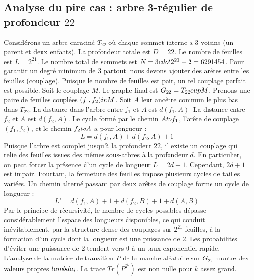\documentclass[12pt,a4paper]{article}
\begin{document}
\subsection{Analyse du pire cas : arbre 3-r\'egulier de profondeur $22$}
Consid\'erons un arbre enracin\'e $T_{22}$ o\`u chaque sommet interne a 3 voisins (un parent et deux enfants).
La profondeur totale est $D = 22$.
Le nombre de feuilles est $L = 2^{21}$.
Le nombre total de sommets est $N = 3 \\cdot 2^{21} - 2 = 6291454$.
Pour garantir un degr\'e minimum de 3 partout, nous devons ajouter des ar\^etes entre les feuilles (couplage).
Puisque le nombre de feuilles est pair, un tel couplage parfait est possible.
Soit le couplage $M$. Le graphe final est $G_{22} = T_{22} \\cup M$.
Prenons une paire de feuilles coupl\'ees $(f_1, f_2) \\in M$.
Soit $A$ leur anc\^etre commun le plus bas dans $T_{22}$.
La distance dans l'arbre entre $f_1$ et $A$ est $d(f_1, A)$.
La distance entre $f_2$ et $A$ est $d(f_2, A)$.
Le cycle form\'e par le chemin $A \\to f_1$, l'ar\^ete de couplage $(f_1, f_2)$, et le chemin $f_2 \\to A$ a pour longueur :
$$ L = d(f_1, A) + d(f_2, A) + 1 $$
Puisque l'arbre est complet jusqu'\`a la profondeur $22$, il existe un couplage qui relie des feuilles issues des m\^emes sous-arbres \`a la profondeur $d$.
En particulier, on peut forcer la pr\'esence d'un cycle de longueur $L = 2d + 1$. Cependant, $2d+1$ est impair.
Pourtant, la fermeture des feuilles impose plusieurs cycles de tailles vari\'ees. Un chemin altern\'e passant par deux ar\^etes de couplage forme un cycle de longueur :
$$ L' = d(f_1, A) + 1 + d(f_2, B) + 1 + d(A, B) $$
Par le principe de r\'ecursivit\'e, le nombre de cycles possibles d\'epasse consid\'erablement l'espace des longueurs disponibles, ce qui conduit in\'evitablement, par la structure dense des couplages sur $2^{21}$ feuilles, \`a la formation d'un cycle dont la longueur est une puissance de 2. Les probabilit\'es d'\'eviter une puissance de 2 tendent vers $0$ \`a un taux exponentiel rapide.
L'analyse de la matrice de transition $P$ de la marche al\'eatoire sur $G_{22}$ montre des valeurs propres $\\lambda_i$. La trace $Tr(P^{2^k})$ est non nulle pour $k$ assez grand.
\end{document}
